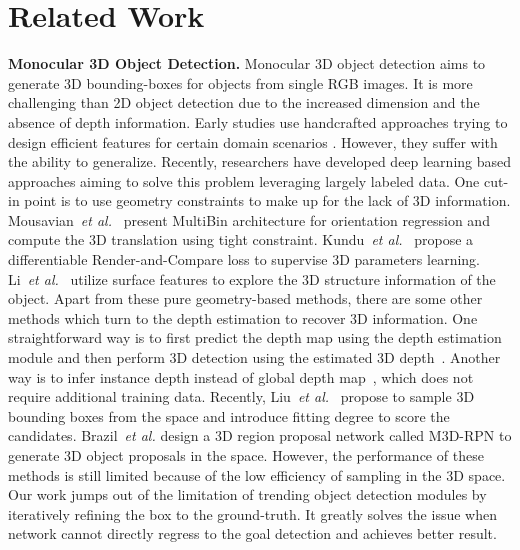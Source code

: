 \documentclass[runningheads]{llncs}
\begin{document}
\section{Related Work}
\noindent
\textbf{Monocular 3D Object Detection.}
Monocular 3D object detection aims to generate 3D bounding-boxes for objects from single RGB images. It is more challenging than 2D object detection due to the increased dimension and the absence of depth information. Early studies use handcrafted approaches trying to design efficient features for certain domain scenarios \cite{payet2011contours,fidler20123d,pepik2015multi,chen2016monocular}. However, they suffer with the ability to generalize. Recently, researchers have developed deep learning based approaches aiming to solve this problem leveraging largely labeled data. One cut-in point is to use geometry constraints to make up for the lack of 3D information. Mousavian~\emph{et al.}~\cite{mousavian20173d} present MultiBin architecture for orientation regression and compute the 3D translation using tight constraint. Kundu~\emph{et al.}~\cite{kundu20183d} propose a differentiable Render-and-Compare loss to supervise 3D parameters learning. Li~\emph{et al.}~\cite{li2019gs3d} utilize surface features to explore the 3D structure information of the object. Apart from these pure geometry-based methods, there are some other methods which turn to the depth estimation to recover 3D information. One straightforward way is to first predict the depth map using the depth estimation module and then perform 3D detection using the estimated 3D depth~\cite{xu2018multi,manhardt2019roi,wang2019pseudo,ma2019accurate}. Another way is to infer instance depth instead of global depth map~\cite{qin2019monogrnet}, which does not require additional training data. Recently, Liu~\emph{et al.}~\cite{liu2019deep} propose to sample 3D bounding boxes from the space and introduce fitting degree to score the candidates. Brazil~\emph{et al.} \cite{brazil2019m3d} design a 3D region proposal network called M3D-RPN to generate 3D object proposals in the space. However, the performance of these methods is still limited because of the low efficiency of sampling in the 3D space. Our work jumps out of the limitation of trending object detection modules by iteratively refining the box to the ground-truth. It greatly solves the issue when network cannot directly regress to the goal detection and achieves better result.
\end{document}
